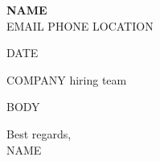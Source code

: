 \documentclass[letterpaper,11pt]{article}
\begin{document}
{\large\textbf{{{NAME}}}}\\
{{EMAIL}} \textbar{} {{PHONE}} \textbar{} {{LOCATION}}

{{DATE}}

{{COMPANY}} hiring team

{{BODY}}

Best regards,\\
{{NAME}}
\end{document}
